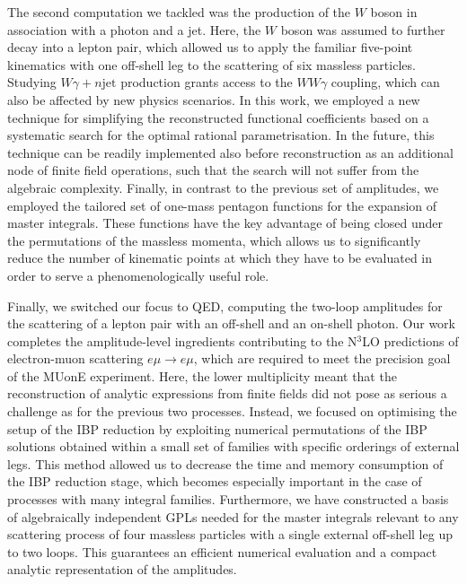 \documentclass[main.tex]{subfiles}
\begin{document}
The second computation we tackled was the production of the $W$ boson in association with a photon and a jet. Here, the $W$ boson was assumed to further decay into a lepton pair, which allowed us to apply the familiar five-point kinematics with one off-shell leg to the scattering of six massless particles. Studying $W\gamma + n \text{jet}$ production grants access to the $W W \gamma$ coupling, which can also be affected by new physics scenarios. In this work, we employed a new technique for simplifying the reconstructed functional coefficients based on a systematic search for the optimal rational parametrisation. In the future, this technique can be readily implemented also before reconstruction as an additional node of finite field operations, such that the search will not suffer from the algebraic complexity. Finally, in contrast to the previous set of amplitudes, we employed the tailored set of one-mass pentagon functions for the expansion of master integrals. These functions have the key advantage of being closed under the permutations of the massless momenta, which allows us to significantly reduce the number of kinematic points at which they have to be evaluated in order to serve a phenomenologically useful role.

Finally, we switched our focus to QED, computing the two-loop amplitudes for the scattering of a lepton pair with an off-shell and an on-shell photon. Our work completes the amplitude-level ingredients contributing to the N$^3$LO predictions of electron-muon scattering $e \mu \to e \mu$, which are required to meet the precision goal of the MUonE experiment. Here, the lower multiplicity meant that the reconstruction of analytic expressions from finite fields did not pose as serious a challenge as for the previous two processes. Instead, we focused on optimising the setup of the IBP reduction by exploiting numerical permutations of the IBP solutions obtained within a small set of families with specific orderings of external legs. This method allowed us to decrease the time and memory consumption of the IBP reduction stage, which becomes especially important in the case of processes with many integral families. Furthermore, we have constructed a basis of algebraically independent GPLs needed for the master integrals relevant to any scattering process of four massless particles with a single external off-shell leg up to two loops. This guarantees an efficient numerical evaluation and a compact analytic representation of the amplitudes.
\end{document}
